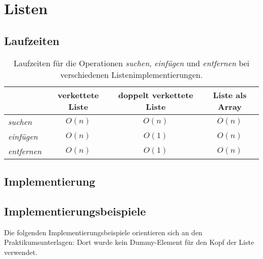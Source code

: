 \section{Listen}

\subsection{Laufzeiten}
\setlength{\tabcolsep}{0.5em}
\renewcommand{\arraystretch}{1.5}%
\begin{table} %
    \centering
    \begin{tabular}{|l | c | c | c|}
        \hline
        & verkettete Liste & doppelt verkettete Liste & Liste als Array \\
        \hline
        \textit{suchen}     &    $O(n) $    &    $O(n)$      & $O(n)$ \\
        \hline
        \textit{einfügen}   &    $O(n) $    &    $O(1)$      & $O(n)$ \\
        \hline
        \textit{entfernen}  &    $O(n) $    &    $O(1)$     &  $O(n)$\\
        \hline
    \end{tabular}
    \caption{Laufzeiten für die Operationen \textit{suchen}, \textit{einfügen} und \textit{entfernen} bei verschiedenen Listenimplementierungen.}
\end{table}

\subsection{Implementierung}

\subsection{Implementierungsbeispiele}

Die folgenden Implementierungsbeispiele orientieren sich an den Praktikumsunterlagen: Dort wurde kein Dummy-Element für
den Kopf der Liste verwendet.

